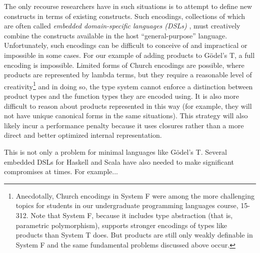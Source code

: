 The only recourse researchers have in such situations is to attempt to define new constructs in terms of existing constructs. Such encodings, collections of which are often called \emph{embedded domain-specific languages (DSLs)} \cite{fowler2010domain}, must creatively combine the constructs available in the host ``general-purpose'' language. Unfortunately, such encodings can be difficult to conceive of and impractical or impossible in some cases. For our example of adding products to G\"odel's T, a full encoding is impossible. Limited forms of Church encodings are possible, where products are represented by lambda terms, but they require a reasonable level of creativity\footnote{Anecdotally, Church encodings in System F  were among the more challenging topics for students in our undergraduate programming languages course, 15-312. Note that System F, because it includes type abstraction (that is, parametric polymorphism), supports stronger encodings of types like products than System T does. But products are still only weakly definable in System F and the same fundamental problems discussed above occur.} and in doing so, the type system cannot enforce a distinction between product types and the function types they are encoded using. It is also more difficult to reason about products represented in this way (for example, they will not have unique canonical forms in the same situations). This strategy will also likely incur a performance penalty because it uses closures rather than a more direct and better optimized internal representation. 

This is not only a problem for minimal languages like G\"odel's T. Several embedded DSLs for Haskell and Scala have also needed to make significant compromises at times. For example... 



